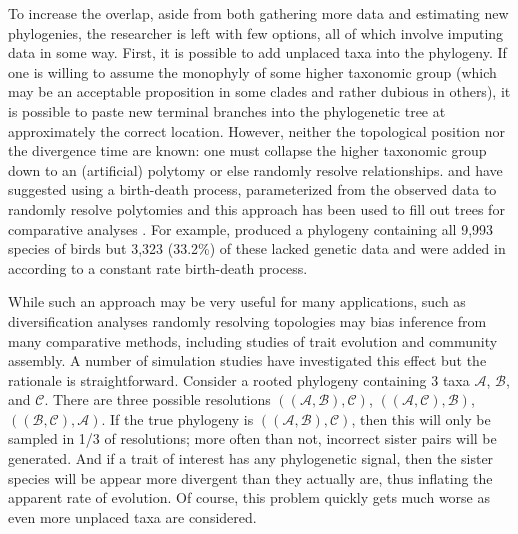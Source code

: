 \documentclass[a4paper,11pt]{article}
\begin{document}
To increase the overlap, aside from both gathering more data and estimating new phylogenies, the researcher is left with few options, all of which involve imputing data in some way. First, it is possible to add unplaced taxa into the phylogeny. If one is willing to assume the monophyly of some higher taxonomic group (which may be an acceptable proposition in some clades and rather dubious in others), it is possible to paste new terminal branches into the phylogenetic tree at approximately the correct location. However, neither the topological position nor the divergence time are known: one must collapse the higher taxonomic group down to an (artificial) polytomy or else randomly resolve relationships. \citet{Kuhn2011} and \citet{ThomasPastis} have suggested using a birth-death process, parameterized from the observed data to randomly resolve polytomies \citep[see also][for a related approach for fossil trees]{Bapst2013} and this approach has been used to fill out trees for comparative analyses \citep{Jetz2012, Price2012, Rolland2014, Jetz2014}. For example, \citet{Jetz2012} produced a phylogeny containing all 9,993 species of birds but 3,323 (33.2\%) of these lacked genetic data and were added in according to a constant rate birth-death process. 

While such an approach may be very useful for many applications, such as diversification analyses \citep{Kuhn2011, Rabosky2015} randomly resolving topologies may bias inference from many comparative methods, including studies of trait evolution and community assembly. A number of simulation studies have investigated this effect \citep{Losos1994, Martins1996, Davies2012, Bapst2014, Rabosky2015} but the rationale is straightforward. Consider a rooted phylogeny containing 3 taxa $\mathcal{A}$, $\mathcal{B}$, and $\mathcal{C}$. There are three possible resolutions $((\mathcal{A},\mathcal{B}),\mathcal{C})$, $((\mathcal{A},\mathcal{C}),\mathcal{B})$, $((\mathcal{B},\mathcal{C}),\mathcal{A})$. If the true phylogeny is $((\mathcal{A},\mathcal{B}),\mathcal{C})$, then this will only be sampled in 1/3 of resolutions; more often than not, incorrect sister pairs will be generated. And if a trait of interest has any phylogenetic signal, then the sister species will be appear more divergent than they actually are, thus inflating the apparent rate of evolution. Of course, this problem quickly gets much worse as even more unplaced taxa are considered.
\end{document}
